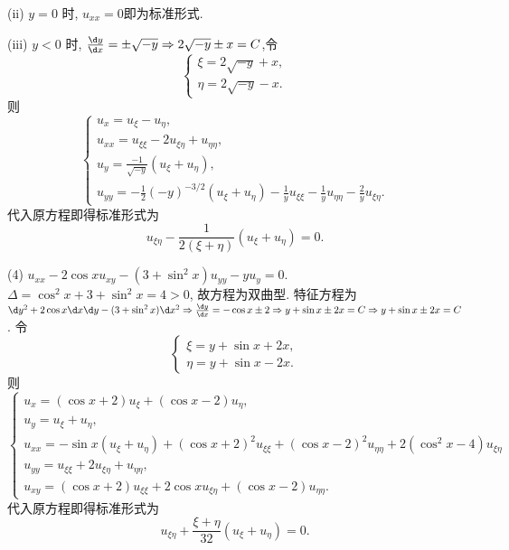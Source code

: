 \begin{solve}
  (ii) $y=0$ 时, $u_{xx}=0$即为标准形式.

  (iii) $y<0$ 时, $\frac{\d y}{\d x}=\pm\sqrt{-y}\Rightarrow 2\sqrt{-y}\pm x=C$,令
  \[\begin{cases}
  \xi = 2\sqrt{-y}+x, \\
  \eta = 2\sqrt{-y}-x.
  \end{cases}\]
  则
  \[\begin{cases}
    u_x=u_{\xi}-u_{\eta}, \\
    u_{xx}=u_{\xi\xi}-2u_{\xi\eta}+u_{\eta\eta}, \\
    u_{y}=\frac{-1}{\sqrt{-y}}(u_{\xi}+u_{\eta}), \\
    u_{yy}=-\frac{1}{2}(-y)^{-3/2}(u_{\xi}+u_{\eta})-\frac{1}{y}u_{\xi\xi}-\frac{1}{y}u_{\eta\eta}-\frac{2}{y}u_{\xi\eta}.
  \end{cases}\]
  代入原方程即得标准形式为
  \[u_{\xi\eta}-\frac{1}{2(\xi+\eta)}(u_{\xi}+u_{\eta}) = 0.\]

  (4) $u_{xx}-2\cos xu_{xy}-(3+\sin^2x)u_{yy}-yu_y=0$.
  $\Delta=\cos^2x+3+\sin^2x=4>0$, 故方程为双曲型.
  特征方程为 $\d y^2+2\cos x\d x\d y-(3+\sin^2x)\d x^2\Rightarrow\frac{\d y}{\d x}=-\cos x\pm2\Rightarrow y+\sin x\pm2x=C\Rightarrow y+\sin x\pm 2x=C$.
  令
  \[\begin{cases}
  \xi = y+\sin x+2x, \\
  \eta = y+\sin x-2x.
  \end{cases}\]
  则
  \[\begin{cases}
    u_x = (\cos x+2)u_{\xi}+(\cos x-2)u_{\eta}, \\
    u_y = u_{\xi}+u_{\eta}, \\
    u_{xx} = -\sin x(u_{\xi}+u_{\eta}) + (\cos x+2)^2u_{\xi\xi}+(\cos x-2)^2u_{\eta\eta}
      + 2(\cos^2x-4)u_{\xi\eta}\\
    u_{yy} = u_{\xi\xi}+2u_{\xi\eta}+u_{\eta\eta}, \\
    u_{xy} = (\cos x+2)u_{\xi\xi}+2\cos xu_{\xi\eta}+(\cos x-2)u_{\eta\eta}.
  \end{cases}\]
  代入原方程即得标准形式为
  \[u_{\xi\eta}+\frac{\xi+\eta}{32}(u_{\xi}+u_{\eta}) = 0.\]


\end{solve}
